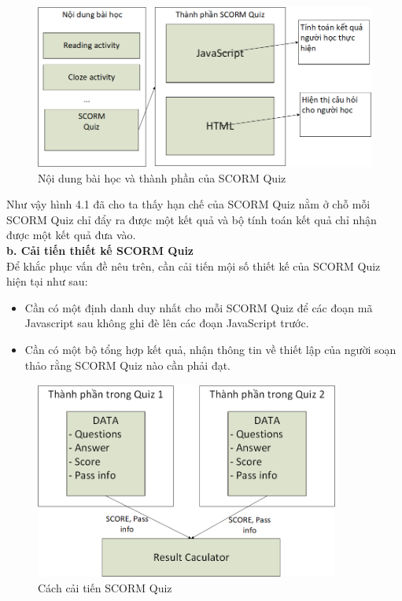	\begin{center}
	\begin{figure}[htp]
		\begin{center}
			\includegraphics[width=15cm]{Chapter4/Pictures/picture41.png}
		\end{center}
		\caption{Nội dung bài học và thành phần của SCORM Quiz}
		\label{refpicture51}
	\end{figure}
\end{center}

Như vậy hình 4.1 đã cho ta thấy hạn chế của SCORM Quiz nằm ở chỗ mỗi SCORM Quiz chỉ đẩy ra được một kết quả và bộ tính toán kết quả chỉ nhận được một kết quả đưa vào. \\

\textbf{b. Cải tiến thiết kế SCORM Quiz}\\

	Để khắc phục vấn đề nêu trên, cần cải tiến mội số thiết kế của SCORM Quiz hiện tại như sau:
	\begin{itemize}
		\item Cần có một định danh duy nhất cho mỗi SCORM Quiz để các đoạn mã Javascript sau không ghi đè lên các đoạn JavaScript trước.
		
		\item Cần có một bộ tổng hợp kết quả, nhận thông tin về thiết lập của người soạn thảo rằng SCORM Quiz nào cần phải đạt.
	\end{itemize}

	\begin{center}
	\begin{figure}[htp]
		\begin{center}
			\includegraphics[width=10cm]{Chapter4/Pictures/picture42.png}
		\end{center}
		\caption{Cách cải tiến SCORM Quiz}
		\label{refpicture51}
	\end{figure}
\end{center}	


